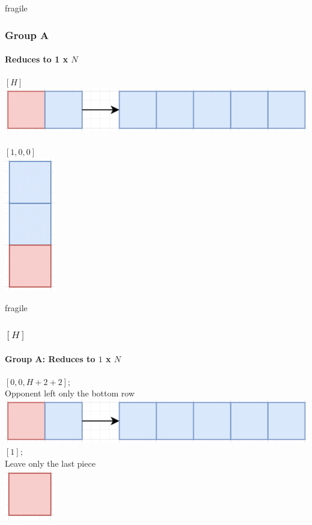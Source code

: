 \documentclass[aspectratio=169,usenames,dvipsnames]{beamer}
\begin{document}
\begin{frame}{fragile}
    \frametitle{Group A}
    \framesubtitle{Reduces to 1 x $N$}
    $[H]$\\
    \includegraphics[scale=.4]{[H].png}\\
    $  $\\
    $[1, 0, 0]$\\
    \includegraphics[scale=.4]{[1, 0, 0].png}
\end{frame}

\begin{frame}{fragile}
    \frametitle{$[H]$}
    \framesubtitle{Group A: Reduces to $1$ x $N$}
    
    \begin{multicols}{2}
    $[0, 0, H + 2 + 2]$; \\
    Opponent left only the bottom row\\
    \includegraphics[scale=.4]{images/[H].png}\\
    $[1]$; \\
    Leave only the last piece\\
    \includegraphics[scale=.4]{images/[1].png}
    \end{multicols}
\end{frame}
\end{document}
